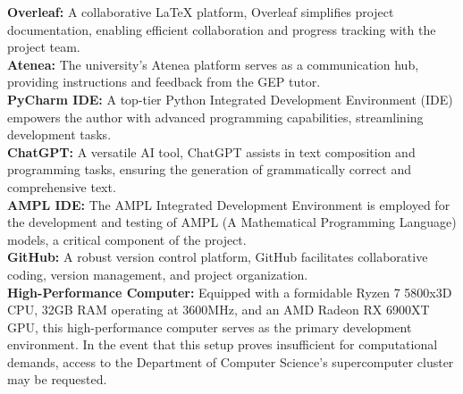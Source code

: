 \hypertarget{ht:overleaf}{}\textbf{Overleaf:} A collaborative LaTeX platform, Overleaf simplifies project documentation, enabling efficient collaboration and progress tracking with the project team. \\
\hypertarget{ht:atenea}{}\textbf{Atenea:} The university's Atenea platform serves as a communication hub, providing instructions and feedback from the GEP tutor. \\
\hypertarget{ht:pycharm}{}\textbf{PyCharm IDE:} A top-tier Python Integrated Development Environment (IDE) empowers the author with advanced programming capabilities, streamlining development tasks.\\
\hypertarget{ht:chatgpt}{}\textbf{ChatGPT:} A versatile AI tool, ChatGPT assists in text composition and programming tasks, ensuring the generation of grammatically correct and comprehensive text.\\
\hypertarget{ht:amplide}{}\textbf{AMPL IDE:} The AMPL Integrated Development Environment is employed for the development and testing of AMPL (A Mathematical Programming Language) models, a critical component of the project.\\
\hypertarget{ht:github}{}\textbf{GitHub:} A robust version control platform, GitHub facilitates collaborative coding, version management, and project organization.\\
\hypertarget{ht:hpc}{}\textbf{High-Performance Computer:} Equipped with a formidable Ryzen 7 5800x3D CPU, 32GB RAM operating at 3600MHz, and an AMD Radeon RX 6900XT GPU, this high-performance computer serves as the primary development environment. In the event that this setup proves insufficient for computational demands, access to the Department of Computer Science's supercomputer cluster may be requested.

